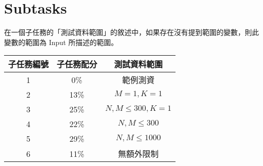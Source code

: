 \documentclass[11pt,a4paper]{article}
\begin{document}
\section*{Subtasks}

在一個子任務的「測試資料範圍」的敘述中，如果存在沒有提到範圍的變數，則此變數的範圍為 Input 所描述的範圍。

\begin{center}
 \begin{tabular}{||c c c||} 
 \hline
 子任務編號 & 子任務配分 & 測試資料範圍 \\  
 \hline
 \hline
 1 & 0\% & 範例測資 \\ 
 \hline
 2 & 13\% & $M =  1 , K = 1 $ \\
 \hline 
 3 & 25\% & $N, M \le  300, K = 1$ \\
 \hline
 4 & 22\% & $N, M \le  300$ \\
 \hline
 5 & 29\% & $N, M \le 1000$ \\
 \hline
 6 & 11\% & 無額外限制 \\
 \hline

\end{tabular}
\end{center}
\end{document}
